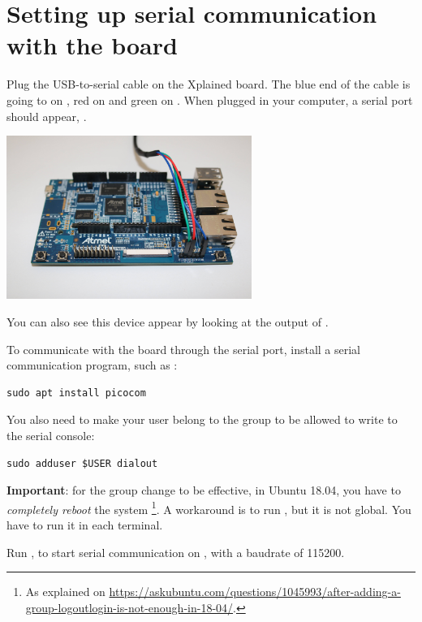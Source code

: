 \section{Setting up serial communication with the board}

Plug the USB-to-serial cable on the Xplained board. The blue end of
the cable is going to  on , red on  and
green on . When plugged in your computer, a serial port
should appear, .

\begin{center}
\includegraphics[width=8cm]{labs/sysdev-u-boot/xplained-serial-connector.jpg}
\end{center}

You can also see this device appear by looking at the output of
.

To communicate with the board through the serial port, install a
serial communication program, such as :

\begin{verbatim}
sudo apt install picocom
\end{verbatim}

You also need to make your user belong to the  group to be
allowed to write to the serial console:

\begin{verbatim}
sudo adduser $USER dialout
\end{verbatim}

{\bf Important}: for the group change to be effective, in Ubuntu 18.04, you have to
{\em completely reboot} the system \footnote{As explained on
\url{https://askubuntu.com/questions/1045993/after-adding-a-group-logoutlogin-is-not-enough-in-18-04/}.}.
A workaround is to run , but it is not global.
You have to run it in each terminal.

Run , to start serial
communication on , with a baudrate of 115200.

